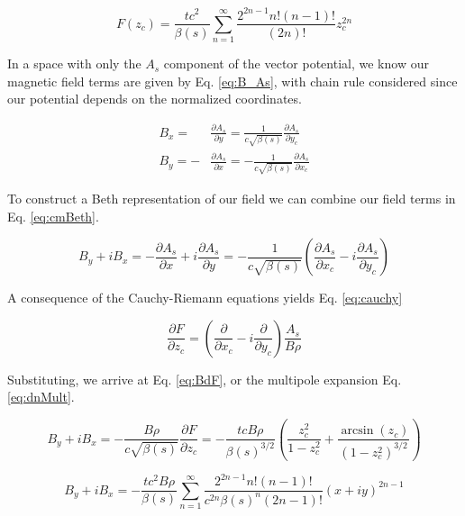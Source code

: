 \begin{equation} \label{eq:powF}
	F(z_c) = \frac{t c^2}{\beta(s)} \sum_{n=1}^{\infty} \frac{2^{2n-1}n!(n-1)!}{(2n)!} z_c^{2n}
\end{equation}

In a space with only the $A_s$ component of the vector potential, we know our magnetic field terms are given by Eq. \ref{eq:B_As}, with chain rule considered since our potential depends on the normalized coordinates.

\begin{equation} \label{eq:B_As}
\begin{split}
	B_x = &\frac{\partial A_s}{\partial y} = \frac{1}{c\sqrt{\beta(s)}}\frac{\partial A_s}{\partial y_c}\\
	B_y = -&\frac{\partial A_s}{\partial x} = -\frac{1}{c\sqrt{\beta(s)}}\frac{\partial A_s}{\partial x_c}
\end{split}
\end{equation}

To construct a Beth representation of our field we can combine our field terms in Eq. \ref{eq:cmBeth}.

\begin{equation} \label{eq:cmBeth}
	B_y + i B_x  = -\frac{\partial A_s}{\partial x} + i\frac{\partial A_s}{\partial y} = -\frac{1}{c\sqrt{\beta(s)}}\left(\frac{\partial A_s}{\partial x_c} - i\frac{\partial A_s}{\partial y_c}\right)
\end{equation}

A consequence of the Cauchy-Riemann equations yields Eq. \ref{eq:cauchy}

\begin{equation} \label{eq:cauchy}
	\frac{\partial F}{\partial z_c} = \left(\frac{\partial }{\partial x_c} - i\frac{\partial }{\partial y_c}\right) \frac{A_s}{B\rho}
\end{equation}

Substituting, we arrive at Eq. \ref{eq:BdF}, or the multipole expansion Eq. \ref{eq:dnMult}.

\begin{equation} \label{eq:BdF}
	B_y + i B_x  = -\frac{B\rho}{c\sqrt{\beta(s)}}\frac{\partial F}{\partial z_c} = - \frac{t c B\rho}{\beta(s)^{3/2}} \left( \frac{z_c^2}{1 - z_c^2} + \frac{\arcsin{(z_c)}}{\left(1-z_c^2\right)^{3/2}}\right)
\end{equation}

\begin{equation} \label{eq:dnMult}
	B_y + i B_x = - \frac{t c^2 B\rho}{\beta(s)} \sum_{n=1}^{\infty} \frac{2^{2n-1}n!(n-1)!}{c^{2n}\beta(s)^n(2n-1)!} (x + i y)^{2n -1}
\end{equation}
